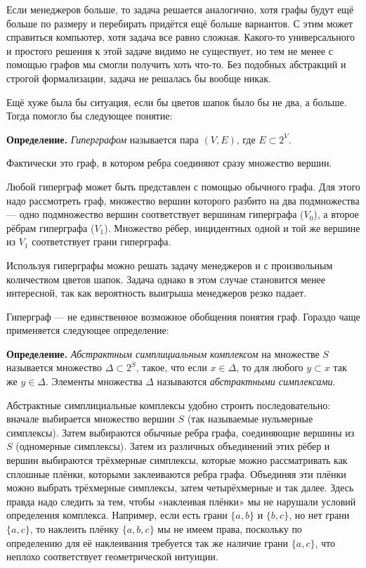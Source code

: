 Если менеджеров больше, то задача решается аналогично, хотя графы будут ещё больше по размеру и перебирать придётся ещё больше вариантов. С этим может справиться компьютер, хотя задача все равно сложная. Какого-то универсального и простого решения к этой задаче видимо не существует, но тем не менее с помощью графов мы смогли получить хоть что-то. Без подобных абстракций и строгой формализации, задача не решалась бы вообще никак.

Ещё хуже была бы ситуация, если бы цветов шапок было бы не два, а больше. Тогда помогло бы следующее понятие:

{\bfseries Определение.} {\slshape Гиперграфом} называется пара $(V, E)$, где $E\subset 2^V$.

Фактически это граф, в котором ребра соединяют сразу множество вершин.

Любой гиперграф может быть представлен с помощью обычного графа. Для этого надо рассмотреть граф, множество вершин которого разбито на два подмножества — одно подмножество вершин соответствует вершинам гиперграфа ($V_0$), а второе рёбрам гиперграфа ($V_1$). Множество рёбер, инцидентных одной и той же вершине из $V_1$ соответствует грани гиперграфа.

Используя гиперграфы можно решать задачу менеджеров и с произвольным количеством цветов шапок. Задача однако в этом случае становится менее интересной, так как вероятность выигрыша менеджеров резко падает.

Гиперграф — не единственное возможное обобщения понятия граф. Гораздо чаще применяется следующее определение:

{\bfseries Определение.} {\slshape Абстрактным симплициальным комплексом} на множестве $S$ называется множество $\Delta\subset 2^S$, такое, что если $x\in \Delta$, то для любого $y\subset x$ так же $y\in\Delta$. Элементы множества $\Delta$ называются {\slshape абстрактными симплексами}.

Абстрактные симплициальные комплексы удобно строить последовательно: вначале выбирается множество вершин $S$ (так называемые нульмерные симплексы). Затем выбираются обычные ребра графа, соединяющие вершины из $S$ (одномерные симплексы). Затем из различных объединений этих рёбер и вершин выбираются трёхмерные симплексы, которые можно рассматривать как сплошные плёнки, которыми заклеиваются ребра графа. Объединяя эти плёнки можно выбрать трёхмерные симплексы, затем четырёхмерные и так далее. Здесь правда надо следить за тем, чтобы «наклеивая плёнки» мы не нарушали условий определения комплекса. Например, если есть грани $\{a, b\}$ и $\{b, c\}$, но нет грани $\{a, c\}$, то наклеить плёнку $\{a, b, c\}$ мы не имеем права, поскольку по определению для её наклеивания требуется так же наличие грани $\{a, c\}$, что неплохо соответствует геометрической интуиции.

